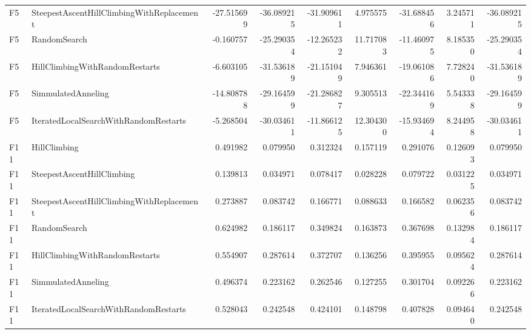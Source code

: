 \begin{tabular}{llrrrrrrr}
F5 & SteepestAscentHillClimbingWithReplacement & -27.515699 & -36.089215 & -31.909611 & 4.975575 & -31.688456 & 3.245711 & -36.089215 \\
F5 & RandomSearch & -0.160757 & -25.290354 & -12.265232 & 11.717083 & -11.460975 & 8.185350 & -25.290354 \\
F5 & HillClimbingWithRandomRestarts & -6.603105 & -31.536189 & -21.151049 & 7.946361 & -19.061086 & 7.728240 & -31.536189 \\
F5 & SimmulatedAnneling & -14.808788 & -29.164599 & -21.286827 & 9.305513 & -22.344169 & 5.543338 & -29.164599 \\
F5 & IteratedLocalSearchWithRandomRestarts & -5.268504 & -30.034611 & -11.866125 & 12.304300 & -15.934694 & 8.244958 & -30.034611 \\
F11 & HillClimbing & 0.491982 & 0.079950 & 0.312324 & 0.157119 & 0.291076 & 0.126093 & 0.079950 \\
F11 & SteepestAscentHillClimbing & 0.139813 & 0.034971 & 0.078417 & 0.028228 & 0.079722 & 0.031225 & 0.034971 \\
F11 & SteepestAscentHillClimbingWithReplacement & 0.273887 & 0.083742 & 0.166771 & 0.088633 & 0.166582 & 0.062356 & 0.083742 \\
F11 & RandomSearch & 0.624982 & 0.186117 & 0.349824 & 0.163873 & 0.367698 & 0.132984 & 0.186117 \\
F11 & HillClimbingWithRandomRestarts & 0.554907 & 0.287614 & 0.372707 & 0.136256 & 0.395955 & 0.095624 & 0.287614 \\
F11 & SimmulatedAnneling & 0.496374 & 0.223162 & 0.262546 & 0.127255 & 0.301704 & 0.092266 & 0.223162 \\
F11 & IteratedLocalSearchWithRandomRestarts & 0.528043 & 0.242548 & 0.424101 & 0.148798 & 0.407828 & 0.094640 & 0.242548 \\
\bottomrule
\end{tabular}
